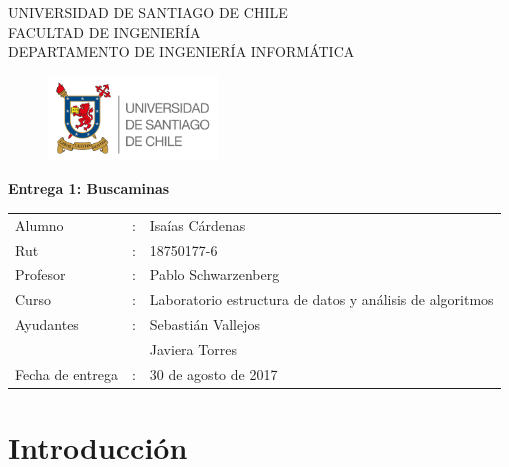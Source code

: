 \documentclass[letterpaper,12pt]{report}
\begin{document}
\renewcommand{\contentsname}{Tabla de Contenido}
\begin{titlepage}
\begin{center}
UNIVERSIDAD DE SANTIAGO DE CHILE\\
FACULTAD DE INGENIERÍA\\
DEPARTAMENTO DE INGENIERÍA INFORMÁTICA\\
\begin{figure}[htb]
\begin{center}
\includegraphics[width=4.5cm]{logo.png}
\end{center}
\end{figure}

\vspace*{0.7in}
\begin{Large}
\textbf{Entrega 1: Buscaminas} \\
\end{Large}
\vspace*{0.3in}

\vspace*{2in}

\end{center}
\begin{flushright}

\begin{tabular}{lll}
Alumno & : & Isaías Cárdenas\\
Rut & : & 18750177-6\\
Profesor & : & Pablo Schwarzenberg\\
Curso & : & Laboratorio estructura de datos y análisis de algoritmos\\
Ayudantes & : & Sebastián Vallejos\\
          &  & Javiera Torres\\
Fecha de entrega & : & 30 de agosto de 2017
\end{tabular}
\end{flushright}
\end{titlepage}

\tableofcontents

\chapter{Introducci\'on}
\end{document}
